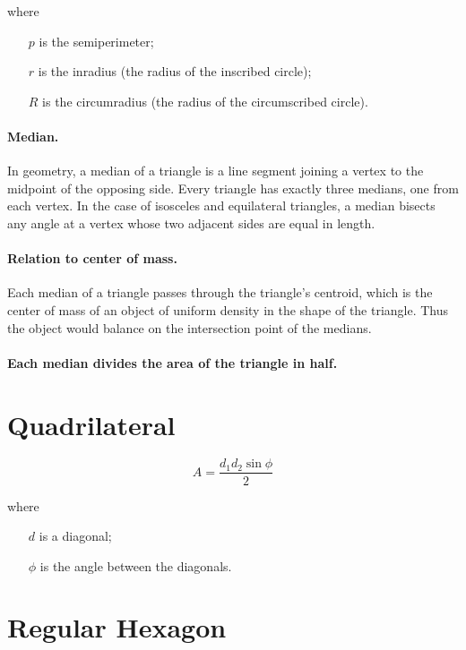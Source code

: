 \documentclass[oneside]{book} %
\theoremstyle{plain}
\begin{document}
where

\begin{itemize}
  \item[\(p\)] is the semiperimeter;
  \item[\(r\)] is the inradius (the radius of the inscribed circle);
  \item[\(R\)] is the circumradius (the radius of the circumscribed circle).
\end{itemize}

\paragraph{Median.} In geometry, a median of a triangle is a line segment
joining a vertex to the midpoint of the opposing side. Every triangle has
exactly three medians, one from each vertex. In the case of isosceles and
equilateral triangles, a median bisects any angle at a vertex whose two adjacent
sides are equal in length.

\paragraph{Relation to center of mass.} Each median of a triangle passes through
the triangle's centroid, which is the center of mass of an object of uniform
density in the shape of the triangle. Thus the object would balance on the
intersection point of the medians.

\paragraph{Each median divides the area of the triangle in half.}

\section{Quadrilateral}
\[A = \frac{d_1 d_2 \sin{\phi}}{2}\]

where

\begin{itemize}
  \item[\(d\)] is a diagonal;
  \item[\(\phi\)] is the angle between the diagonals.
\end{itemize}

\section{Regular Hexagon}
\end{document}
